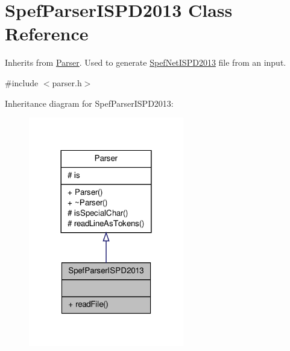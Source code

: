 \hypertarget{classSpefParserISPD2013}{\section{Spef\-Parser\-I\-S\-P\-D2013 Class Reference}
\label{classSpefParserISPD2013}
}


Inherits from \hyperlink{classParser}{Parser}. Used to generate \hyperlink{classSpefNetISPD2013}{Spef\-Net\-I\-S\-P\-D2013} file from an input.  




{\ttfamily \#include $<$parser.\-h$>$}



Inheritance diagram for Spef\-Parser\-I\-S\-P\-D2013\-:\nopagebreak
\begin{figure}[H]
\begin{center}
\leavevmode
\includegraphics[width=192pt]{classSpefParserISPD2013__inherit__graph}
\end{center}
\end{figure}


